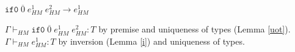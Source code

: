 \begin{case}
$\mathtt{if0}\;\overline{0}\;e_{HM}^{1}\;e_{HM}^{2}\rightarrow e_{HM}^{1}$

$\Gamma\vdash_{HM}\mathtt{if0}\;\overline{0}\;e_{HM}^{1}\;e_{HM}^{2}:T$ by premise and uniqueness of types (Lemma \ref{uot}).  $\Gamma\vdash_{HM}e_{HM}^{1}:T$ by inversion (Lemma \ref{i}) and uniqueness of types.
\end{case}